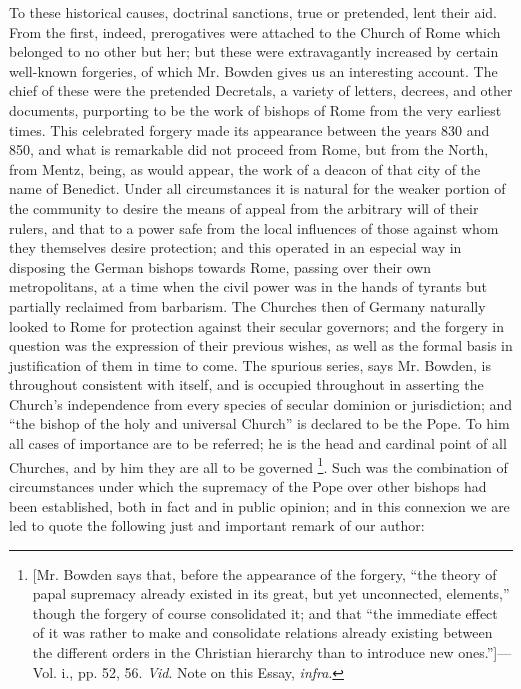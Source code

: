 To these historical causes, doctrinal sanctions,
true or pretended, lent their aid. From the first, indeed,
prerogatives were attached to the Church of Rome which belonged to no
other but her; but these were extravagantly increased by certain
well-known forgeries, of which Mr. Bowden gives us an interesting
account. The chief of these were the pretended Decretals, a variety of
letters, decrees, and other documents, purporting to be the work of
bishops of Rome from the very earliest times. This celebrated forgery
made its appearance between the years 830 and 850, and what is
remarkable did not proceed from Rome, but from the North, from Mentz,
being, as would appear, the work of a deacon of that city of the
name of Benedict. Under all circumstances it is natural for the weaker
portion of the community to desire the means of appeal from the
arbitrary will of their rulers, and that to a power safe from the
local influences of those against whom they themselves desire
protection; and this operated in an especial way in disposing the
German bishops towards Rome, passing over their own metropolitans, at
a time when the civil power was in the hands of tyrants but partially
reclaimed from barbarism. The Churches then of Germany naturally
looked to Rome for protection against their secular governors; and the
forgery in question was the expression of their previous wishes, as
well as the formal basis in justification of them in time to come. The
spurious series, says Mr. Bowden, is throughout consistent with
itself, and is occupied throughout in asserting the Church's
independence from every species of secular dominion or jurisdiction;
and ``the bishop of the holy and universal Church'' is declared to be
the Pope. To him all cases of importance are to be referred; he is the
head and cardinal point of all Churches, and by him they are all to be
governed \footnote{[Mr. Bowden says that, before the appearance of
the forgery, ``the theory of papal supremacy already existed in its
great, but yet unconnected, elements,'' though the forgery of course
consolidated it; and that ``the immediate effect of it was rather to
make and consolidate relations already existing between the different
orders in the Christian hierarchy than to introduce new ones.'']—Vol.
i., pp. 52, 56. \emph{Vid}. Note on this
Essay, \emph{infra}.}. Such was the
combination of circumstances under which the supremacy of the Pope
over other bishops had been established, both in fact and in public
opinion; and in this connexion we are led to quote the following just
and important remark of our author:

